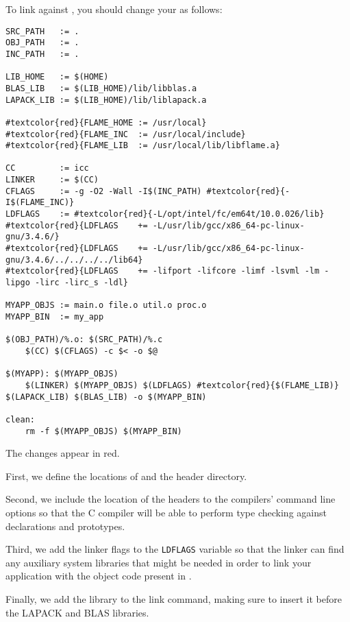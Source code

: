 \noindent
To link against \libflame, you should change your \makefile as follows:

\begin{Verbatim}[frame=single,framesep=2.5mm,xleftmargin=5mm,commandchars=\#\{\},fontsize=\footnotesize]
SRC_PATH   := .
OBJ_PATH   := .
INC_PATH   := .

LIB_HOME   := $(HOME)
BLAS_LIB   := $(LIB_HOME)/lib/libblas.a
LAPACK_LIB := $(LIB_HOME)/lib/liblapack.a

#textcolor{red}{FLAME_HOME := /usr/local}
#textcolor{red}{FLAME_INC  := /usr/local/include}
#textcolor{red}{FLAME_LIB  := /usr/local/lib/libflame.a}

CC         := icc
LINKER     := $(CC)
CFLAGS     := -g -O2 -Wall -I$(INC_PATH) #textcolor{red}{-I$(FLAME_INC)}
LDFLAGS    := #textcolor{red}{-L/opt/intel/fc/em64t/10.0.026/lib}
#textcolor{red}{LDFLAGS    += -L/usr/lib/gcc/x86_64-pc-linux-gnu/3.4.6/}
#textcolor{red}{LDFLAGS    += -L/usr/lib/gcc/x86_64-pc-linux-gnu/3.4.6/../../../../lib64}
#textcolor{red}{LDFLAGS    += -lifport -lifcore -limf -lsvml -lm -lipgo -lirc -lirc_s -ldl}

MYAPP_OBJS := main.o file.o util.o proc.o
MYAPP_BIN  := my_app

$(OBJ_PATH)/%.o: $(SRC_PATH)/%.c
    $(CC) $(CFLAGS) -c $< -o $@

$(MYAPP): $(MYAPP_OBJS)
    $(LINKER) $(MYAPP_OBJS) $(LDFLAGS) #textcolor{red}{$(FLAME_LIB)} $(LAPACK_LIB) $(BLAS_LIB) -o $(MYAPP_BIN)

clean:
    rm -f $(MYAPP_OBJS) $(MYAPP_BIN)
\end{Verbatim}

\noindent
The changes appear in red.

First, we define the locations of \libflame and the \libflame header directory.

Second, we include the location of the \libflame headers to the compilers'
command line options so that the C compiler will be able to perform type
checking against \libflame declarations and prototypes.

Third, we add the linker flags to the {\tt LDFLAGS} variable so that the
linker can find any auxiliary system libraries that might be needed in
order to link your application with the object code present in \libflamens.

Finally, we add the \libflame library to the link command, making sure to
insert it before the LAPACK and BLAS libraries.




